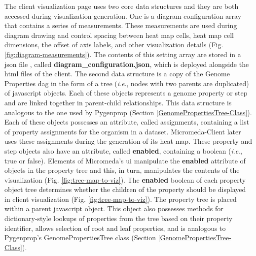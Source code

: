 The client visualization page uses two core data structures and they are both 
accessed during visualization generation. One is a diagram configuration array 
that contains a series of measurements. These measurements are used during 
diagram drawing and control spacing between heat map cells, heat map cell 
dimensions, the offset of axis labels, and other visualization details (Fig. 
\ref{fig:diagram-measurements}). The contents of this setting array are stored 
in a \gls{json} file \cite{bray2014rfc}, called 
\textbf{diagram\_configuration.json}, which is deployed alongside the \gls{html} 
files of the client. The second data structure is a copy of the Genome 
Properties \gls{dag} in the form of a tree (\textit{i}.\textit{e}., nodes with two parents are 
duplicated) of \gls{javascript} objects. Each of these objects represents a 
genome property or step and are linked together in parent-child relationships. 
This data structure is analogous to the one used by Pygenprop (Section 
\ref{GenomePropertiesTree-Class}). Each of these objects possesses an attribute, 
called assignments, containing a list of property assignments for the organism 
in a dataset. Micromeda-Client later uses these assignments during the 
generation of its heat map. These property and step objects also have an 
attribute, called \textbf{enabled}, containing a boolean (\textit{i}.\textit{e}., true or false). 
Elements of Micromeda's \gls{ui} manipulate the \textbf{enabled} attribute of 
objects in the property tree and this, in turn, manipulates the contents of the 
visualization (Fig. \ref{fig:tree-map-to-viz}). The \textbf{enabled} boolean of 
each property object tree determines whether the children of the property should 
be displayed in client visualization (Fig. \ref{fig:tree-map-to-viz}). The 
property tree is placed within a parent \gls{javascript} object. This object 
also possesses methods for dictionary-style lookups of properties from the tree 
based on their property identifier, allows selection of root and leaf 
properties, and is analogous to Pygenprop's GenomePropertiesTree class (Section 
\ref{GenomePropertiesTree-Class}).

